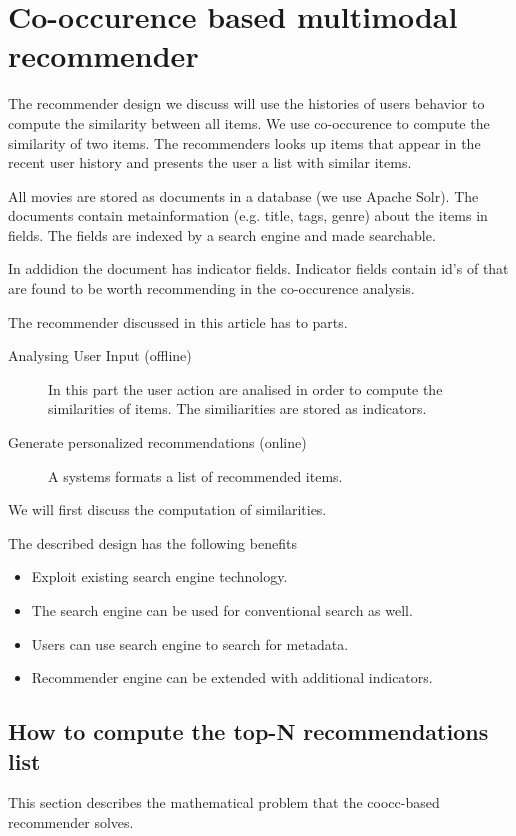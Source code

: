 \section{Co-occurence based multimodal recommender}
\label{sec:design}

The recommender design we discuss will use the histories of users behavior to compute the similarity between all items. We use co-occurence to compute the similarity of two items. The recommenders looks up items that appear in the recent user history and presents the user a list with similar items.

All movies are stored as documents in a database (we use Apache Solr). The documents contain metainformation (e.g. title, tags, genre) about the items in fields. The fields are indexed by a search engine and made searchable.

In addidion the document has indicator fields. Indicator fields contain id's of that are found to be worth recommending in the co-occurence analysis.

The recommender discussed in this article has to parts.
\begin{description}
\item[Analysing User Input (offline)] In this part the user action are analised in order to compute the similarities of items. The similiarities are stored as indicators.
\item[Generate personalized recommendations (online)] A systems formats a list of recommended items.
\end{description}
We will first discuss the computation of similarities.


The described design has the following benefits
\begin{itemize}
\item Exploit existing search engine technology.
\item The search engine can be used for conventional search as well.
\item Users can use search engine to search for metadata.
\item Recommender engine can be extended with additional indicators.
\end{itemize}

\subsection{How to compute the top-N recommendations list}
\label{sec:problem}
This section describes the mathematical problem that the \gls{coocc}-based recommender solves.

